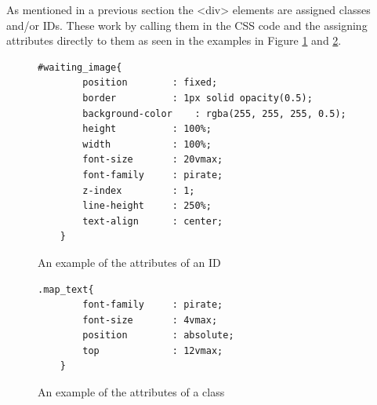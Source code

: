 As mentioned in a previous section the <div> elements are assigned classes and/or IDs. These work by calling them in the CSS code and the assigning attributes directly to them as seen in the examples in Figure \ref{IDex} and \ref{Classex}. 
\begin{figure}
\begin{lstlisting}
#waiting_image{
		position		: fixed;
		border			: 1px solid opacity(0.5);
		background-color	: rgba(255, 255, 255, 0.5);
		height			: 100%;
		width			: 100%;
		font-size		: 20vmax;
		font-family		: pirate;
		z-index			: 1;
		line-height		: 250%;
		text-align		: center;
	}
\end{lstlisting} 
\caption{An example of the attributes of an ID \label{IDex}}
\end{figure}

\begin{figure}
\begin{lstlisting}
.map_text{
		font-family		: pirate;
		font-size		: 4vmax;
		position		: absolute;
		top				: 12vmax;
	}
\end{lstlisting} 
\caption{An example of the attributes of a class \label{Classex}}
\end{figure}